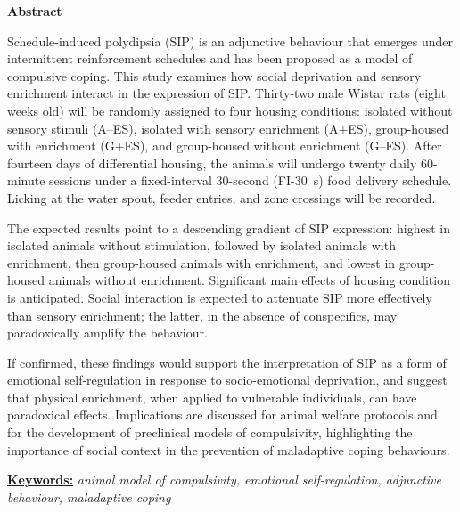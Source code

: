 \documentclass[12pt,a4paper]{article}
\begin{document}
    \vspace{5mm}
    
    \begin{center}
    \textbf{\large Abstract}
    \end{center}
    
    \begin{center}
    \begin{minipage}{0.9\textwidth}
    \noindent
    Schedule-induced polydipsia (SIP) is an adjunctive behaviour that emerges under intermittent reinforcement schedules and has been proposed as a model of compulsive coping. This study examines how social deprivation and sensory enrichment interact in the expression of SIP. Thirty-two male Wistar rats (eight weeks old) will be randomly assigned to four housing conditions: isolated without sensory stimuli (A--ES), isolated with sensory enrichment (A+ES), group-housed with enrichment (G+ES), and group-housed without enrichment (G--ES). After fourteen days of differential housing, the animals will undergo twenty daily 60-minute sessions under a fixed-interval 30-second (FI-30~s) food delivery schedule. Licking at the water spout, feeder entries, and zone crossings will be recorded.

    The expected results point to a descending gradient of SIP expression: highest in isolated animals without stimulation, followed by isolated animals with enrichment, then group-housed animals with enrichment, and lowest in group-housed animals without enrichment. Significant main effects of housing condition is anticipated. Social interaction is expected to attenuate SIP more effectively than sensory enrichment; the latter, in the absence of conspecifics, may paradoxically amplify the behaviour.

    If confirmed, these findings would support the interpretation of SIP as a form of emotional self-regulation in response to socio-emotional deprivation, and suggest that physical enrichment, when applied to vulnerable individuals, can have paradoxical effects. Implications are discussed for animal welfare protocols and for the development of preclinical models of compulsivity, highlighting the importance of social context in the prevention of maladaptive coping behaviours.
    
    \vspace{2mm}
    \noindent
    \underline{\textbf{Keywords:}} \textit{animal model of compulsivity, emotional self-regulation, adjunctive behaviour, maladaptive coping}
    \end{minipage}
    \end{center}
    
\end{document}
